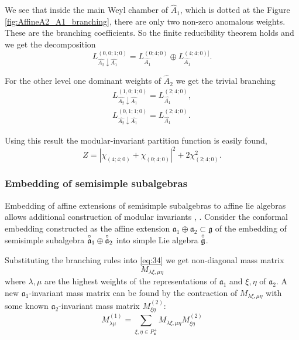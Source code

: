 \documentclass[a4paper,12pt]{article}
\theoremstyle{definition} \newtheorem{Def}{Definition}
\newcommand{\go}{\overset{\circ }{\frak{g}}}
\newcommand{\ao}{\overset{\circ }{\frak{a}}}
\begin{document}
We see that inside the main Weyl chamber of $\hat{A}_1$, which is dotted at the Figure \ref{fig:AffineA2_A1_branching}, there are only two non-zero anomalous weights. These are the branching coefficients. So the finite reducibility theorem holds and we get the decomposition
\begin{equation}
  \label{eq:43}
  L^{(0,0;1;0)}_{\hat{A_2}\downarrow \hat{A_1}}= L_{\hat{A_1}}^{(0;4;0)}\oplus L_{\hat{A_1}}^{(4;4;0)]}.
\end{equation}

For the other level one dominant weights of $\hat{A}_2$ we get the trivial
branching 
\begin{eqnarray}
  \label{eq:44}
   L^{(1,0;1;0)}_{\hat{A_2}\downarrow \hat{A_1}}= L_{\hat{A_1}}^{(2;4;0)},\\
   L^{(0,1;1;0)}_{\hat{A_2}\downarrow \hat{A_1}}= L_{\hat{A_1}}^{(2;4;0)}.
\end{eqnarray}

Using this result the modular-invariant partition function is easily found,
\begin{equation}
  \label{eq:45}
  Z=\left|\chi_{(4;4;0)}+\chi_{(0;4;0)}\right|^2+2\chi_{(2;4;0)}^2.
\end{equation}

\subsubsection{Embedding of semisimple subalgebras}
\label{sec:embedd-semis-subalg}

Embedding of affine extensions of semisimple subalgebras to affine lie algebras allows additional construction of modular invariants \cite{difrancesco1997cft}, \cite{walton1989conformal}. Consider the conformal embedding constructed as the affine extension  $\mathfrak{a}_{1}\oplus\mathfrak{a}_{2}\subset \mathfrak{g}$ of the embedding of semisimple subalgebra $\ao_1\oplus\ao_2$ into simple Lie algebra $\go$.

Substituting the branching rules into \eqref{eq:34} we get non-diagonal mass matrix
\begin{equation}
  \label{eq:2}
  M_{\lambda\xi,\mu\eta}
\end{equation}
where $\lambda,\mu$ are the highest weights of the representations of $\mathfrak{a}_1$ and $\xi,\eta$ of $\mathfrak{a}_2$. A new $\mathfrak{a}_1$-invariant mass matrix can be found by the contraction of $M_{\lambda\xi,\mu\eta}$ with some known $\mathfrak{a}_2$-invariant mass matrix $M^{(2)}_{\xi\eta}$:
\begin{equation}
  \label{eq:35}
  M^{(1)}_{\lambda\mu}=\sum_{\xi,\eta\in P_{\mathfrak{a}}^{+}}M_{\lambda\xi,\mu\eta}M^{(2)}_{\xi\eta}
\end{equation}
\end{document}

